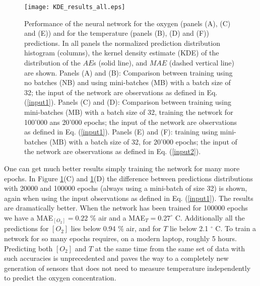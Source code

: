 \documentclass[9pt,twocolumn,twoside,pdftex]{optica}
\begin{document}
\begin{figure}[htbp]
\centering
\texttt{[image: KDE\_results\_all.eps]}
\caption{Performance of the neural network for the oxygen (panels (A), (C) and (E)) and for the temperature (panels (B), (D) and (F)) predictions. In all panels the normalized prediction distribution histogram (columns), the kernel density estimate (KDE) of the distribution of the $AE$s (solid line), and $MAE$ (dashed vertical line) are shown. Panels (A) and (B): Comparison between training using no batches (NB) and using mini-batches (MB) with a batch size of 32; the input of the network are observations as defined in Eq. (\ref{input1}). Panels (C) and (D): Comparison between training using mini-batches (MB) with a batch size of 32, training the network for 100'000 ans 20'000 epochs; the input of the network are observations as defined in Eq. (\ref{input1}). Panels (E) and (F): training using mini-batches (MB) with a batch size of 32, for 20'000 epochs; the input of the network are observations as defined in Eq. (\ref{input2}).}
\label{fig:KDE_results_all}
\end{figure}


One can get much better results simply training the network for many more epochs. In Figure \ref{fig:KDE_results_all}(C) and \ref{fig:KDE_results_all}(D) the difference between predictions distributions with 20000 and 100000 epochs (always using a mini-batch of size 32) is shown, again when using the input observations as defined in Eq. (\ref{input1}). The results are dramatically better. When the network has been trained for 100000 epochs we have a MAE$_{[O_2]}=0.22$ \% air and a MAE$_{T}=0.27^\circ$ C. Additionally all the predictions for $[O_2]$ lies below 0.94 \% air, and for $T$ lie below 2.1 $^\circ$ C. To train a network for so many epochs requires, on a modern laptop, roughly 5 hours. Predicting both $[O_2]$ and $T$ at the same time from the same set of data with such accuracies is unprecedented and paves the way to a completely new generation of sensors that does not need to measure temperature independently to predict the oxygen concentration.
\end{document}
